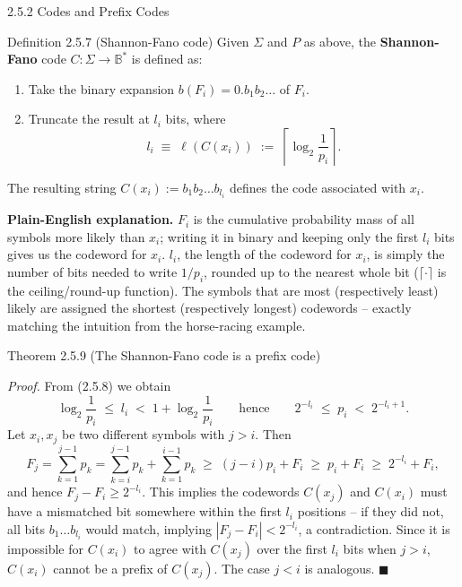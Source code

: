 \documentclass[aspectratio=169,10pt]{beamer}
\begin{document}
\begin{frame}[allowframebreaks]{2.5.2 Codes and Prefix Codes}
\framebreak

\begin{block}{Definition 2.5.7 (Shannon-Fano code)}
Given $\Sigma$ and $P$ as above, the \textbf{Shannon-Fano} code $C : \Sigma
\to \mathbb{B}^*$ is defined as:
\begin{enumerate}
  \item Take the binary expansion $b(F_i) = 0.b_1 b_2 \ldots$ of $F_i$.
  \item Truncate the result at $l_i$ bits, where
  \[
    l_i \;\equiv\; \ell(C(x_i)) \;:=\; \left\lceil \log_2 \frac{1}{p_i} \right\rceil. \tag{2.5.8}
  \]
\end{enumerate}
The resulting string $C(x_i) := b_1 b_2 \ldots b_{l_i}$ defines the code
associated with $x_i$.
\end{block}

\textbf{Plain-English explanation.} $F_i$ is the cumulative probability mass
of all symbols more likely than $x_i$; writing it in binary and keeping only
the first $l_i$ bits gives us the codeword for $x_i$. $l_i$, the length of
the codeword for $x_i$, is simply the number of bits needed to write
$1/p_i$, rounded up to the nearest whole bit ($\lceil\cdot\rceil$ is the
ceiling/round-up function). The symbols that are most (respectively least)
likely are assigned the shortest (respectively longest) codewords -- exactly
matching the intuition from the horse-racing example.

\framebreak

\begin{block}{Theorem 2.5.9 (The Shannon-Fano code is a prefix code)}
\end{block}

\textit{Proof.} From (2.5.8) we obtain
\[
  \log_2 \frac{1}{p_i} \;\leq\; l_i \;<\; 1 + \log_2\frac{1}{p_i}
  \qquad\text{hence}\qquad
  2^{-l_i} \;\leq\; p_i \;<\; 2^{-l_i+1}.
\]
Let $x_i, x_j$ be two different symbols with $j > i$. Then
\[
  F_j = \sum_{k=1}^{j-1}p_k = \sum_{k=i}^{j-1}p_k + \sum_{k=1}^{i-1}p_k
  \;\geq\; (j-i)p_i + F_i \;\geq\; p_i + F_i \;\geq\; 2^{-l_i} + F_i,
\]
and hence $F_j - F_i \geq 2^{-l_i}$. This implies the codewords $C(x_j)$ and
$C(x_i)$ must have a mismatched bit somewhere within the first $l_i$
positions -- if they did not, all bits $b_1 \ldots b_{l_i}$ would match,
implying $|F_j - F_i| < 2^{-l_i}$, a contradiction. Since it is impossible
for $C(x_i)$ to agree with $C(x_j)$ over the first $l_i$ bits when $j>i$,
$C(x_i)$ cannot be a prefix of $C(x_j)$. The case $j<i$ is analogous.
$\blacksquare$


\end{frame}
\end{document}
